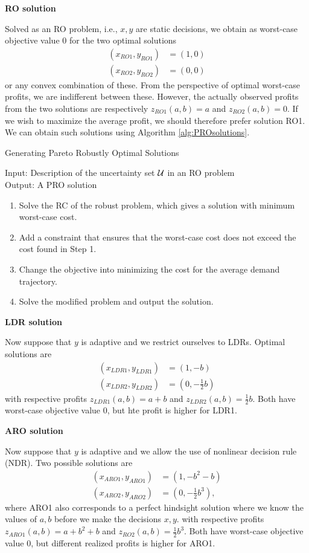 \textbf{RO solution}

Solved as an RO problem, i.e., $x,y$ are static decisions, we obtain as worst-case objective value 0 for the two optimal solutions 
\begin{align*}
(x_{RO1},y_{RO1}) & = (1,0) \\
(x_{RO2},y_{RO2}) & = (0,0)
\end{align*}
or any convex combination of these. From the perspective of optimal worst-case profits, we are indifferent between these. However, the actually observed profits from the two solutions are respectively $z_{RO1} (a,b) = a$ and $z_{RO2}(a,b) = 0$. If we wish to maximize the average profit, we should therefore prefer solution RO1. We can obtain such solutions using Algorithm \ref{alg:PROsolutions}.
 
 \begin{algorithm}
\caption{Generating Pareto Robustly Optimal Solutions}\label{alg:PROsolutions}
\begin{algorithmic}
Input: Description of the uncertainty set $\mathcal{U}$ in an RO problem \\
Output: A PRO solution
\begin{enumerate}
	\item Solve the RC of the robust problem, which gives a solution with minimum worst-case cost. 
	\item Add a constraint that ensures that the worst-case cost does not exceed the cost found in Step 1.
	\item Change the objective into minimizing the cost for the average demand trajectory.
\item Solve the modified problem and output the solution.
\end{enumerate}
\end{algorithmic}
\end{algorithm}

\textbf{LDR solution}

Now suppose that $y$ is adaptive and we restrict ourselves to LDRs. Optimal solutions are
\begin{align*}
(x_{LDR1},y_{LDR1}) & = (1,-b) \\
(x_{LDR2},y_{LDR2}) & = (0, -\frac{1}{2}b)
\end{align*}
with respective profits $z_{LDR1} (a,b) = a + b$ and $z_{LDR2}(a,b) = \frac{1}{2}b$. Both have worst-case objective value 0, but hte profit is higher for LDR1.

\textbf{ARO solution}

Now suppose that $y$ is adaptive and we allow the use of nonlinear decision rule (NDR). Two possible solutions are
\begin{align*}
(x_{ARO1},y_{ARO1}) & = (1,-b^2-b) \\
(x_{ARO2},y_{ARO2}) & = (0, -\frac{1}{2}b^3),
\end{align*}
where ARO1 also corresponds to a perfect hindsight solution where we know the values of $a,b$ before we make the decisions $x,y$. 
with respective profits $z_{ARO1} (a,b) = a + b^2+b$ and $z_{RO2}(a,b) = \frac{1}{2}b^3$. Both have worst-case objective value 0, but different realized profits is higher for ARO1.

